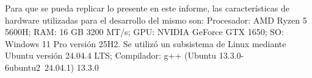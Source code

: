 Para que se pueda replicar lo presente en este informe, las características de hardware utilizadas para el desarrollo del mismo son: Procesador: AMD Ryzen 5 5600H; RAM: 16 GB 3200 MT/s; GPU: NVIDIA GeForce GTX 1650; SO: Windows 11 Pro versión 25H2. Se utilizó un subsistema de Linux mediante Ubuntu versión 24.04.4 LTS; Compilador: g++ (Ubuntu 13.3.0-6ubuntu2~24.04.1) 13.3.0
